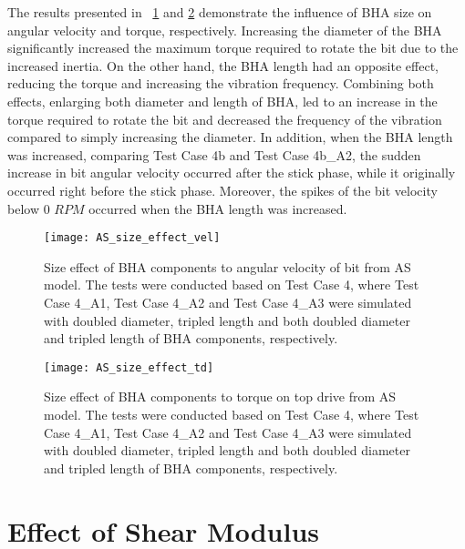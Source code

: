 The results presented in \figurename~\ref{figure_AS_BHA_size_effect_vel} and \ref{figure_AS_BHA_size_effect_td} demonstrate the influence of BHA size on angular velocity and torque, respectively. Increasing the diameter of the BHA significantly increased the maximum torque required to rotate the bit due to the increased inertia. On the other hand, the BHA length had an opposite effect, reducing the torque and increasing the vibration frequency. Combining both effects, enlarging both diameter and length of BHA, led to an increase in the torque required to rotate the bit and decreased the frequency of the vibration compared to simply increasing the diameter. In addition, when the BHA length was increased, comparing Test Case 4b and Test Case 4b\_A2, the sudden increase in bit angular velocity occurred after the stick phase, while it originally occurred right before the stick phase. Moreover, the spikes of the bit velocity below 0 $RPM$ occurred when the BHA length was increased.
\begin{figure}
  \centering
  \texttt{[image: AS\_size\_effect\_vel]}
  \caption[Size effect of BHA components to angular velocity from AS model]{Size effect of BHA components to angular velocity of bit from AS model. The tests were conducted based on Test Case 4, where Test Case 4\_A1, Test Case 4\_A2 and Test Case 4\_A3 were simulated with doubled diameter, tripled length and both doubled diameter and tripled length of BHA components, respectively.}\label{figure_AS_BHA_size_effect_vel}
\end{figure}

\begin{figure}
  \centering
  \texttt{[image: AS\_size\_effect\_td]}
  \caption[Size effect of BHA components to a torque from AS model]{Size effect of BHA components to torque on top drive from AS model. The tests were conducted based on Test Case 4, where Test Case 4\_A1, Test Case 4\_A2 and Test Case 4\_A3 were simulated with doubled diameter, tripled length and both doubled diameter and tripled length of BHA components, respectively.}\label{figure_AS_BHA_size_effect_td}
\end{figure}

\section{Effect of Shear Modulus} 